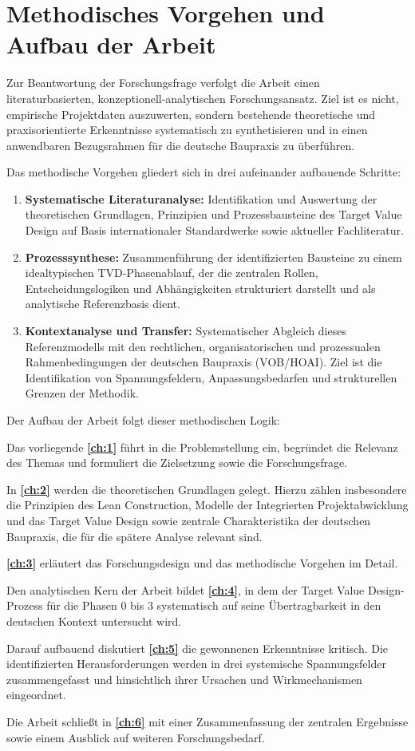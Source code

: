 \section{Methodisches Vorgehen und Aufbau der Arbeit}
\label{sec:1.3}

Zur Beantwortung der Forschungsfrage verfolgt die Arbeit einen literaturbasierten, konzeptionell-analytischen Forschungsansatz. Ziel ist es nicht, empirische Projektdaten auszuwerten, sondern bestehende theoretische und praxisorientierte Erkenntnisse systematisch zu synthetisieren und in einen anwendbaren Bezugsrahmen für die deutsche Baupraxis zu überführen.

Das methodische Vorgehen gliedert sich in drei aufeinander aufbauende Schritte:
\begin{enumerate}
    \item \textbf{Systematische Literaturanalyse:} Identifikation und Auswertung der theoretischen Grundlagen, Prinzipien und Prozessbausteine des Target Value Design auf Basis internationaler Standardwerke sowie aktueller Fachliteratur.
    \item \textbf{Prozesssynthese:} Zusammenführung der identifizierten Bausteine zu einem idealtypischen \acs{TVD}-Phasenablauf, der die zentralen Rollen, Entscheidungslogiken und Abhängigkeiten strukturiert darstellt und als analytische Referenzbasis dient.
    \item \textbf{Kontextanalyse und Transfer:} Systematischer Abgleich dieses Referenzmodells mit den rechtlichen, organisatorischen und prozessualen Rahmenbedingungen der deutschen Baupraxis (\acs{VOB}/\acs{HOAI}). Ziel ist die Identifikation von Spannungsfeldern, Anpassungsbedarfen und strukturellen Grenzen der Methodik.
\end{enumerate}

Der Aufbau der Arbeit folgt dieser methodischen Logik:

Das vorliegende \textbf{\cref{ch:1}} führt in die Problemstellung ein, begründet die Relevanz des Themas und formuliert die Zielsetzung sowie die Forschungsfrage.

In \textbf{\cref{ch:2}} werden die theoretischen Grundlagen gelegt. Hierzu zählen insbesondere die Prinzipien des Lean Construction, Modelle der Integrierten Projektabwicklung und das Target Value Design sowie zentrale Charakteristika der deutschen Baupraxis, die für die spätere Analyse relevant sind.

\textbf{\cref{ch:3}} erläutert das Forschungsdesign und das methodische Vorgehen im Detail.

Den analytischen Kern der Arbeit bildet \textbf{\cref{ch:4}}, in dem der Target Value Design-Prozess für die Phasen 0 bis 3 systematisch auf seine Übertragbarkeit in den deutschen Kontext untersucht wird.

Darauf aufbauend diskutiert \textbf{\cref{ch:5}} die gewonnenen Erkenntnisse kritisch. Die identifizierten Herausforderungen werden in drei systemische Spannungsfelder zusammengefasst und hinsichtlich ihrer Ursachen und Wirkmechanismen eingeordnet.

Die Arbeit schließt in \textbf{\cref{ch:6}} mit einer Zusammenfassung der zentralen Ergebnisse sowie einem Ausblick auf weiteren Forschungsbedarf.